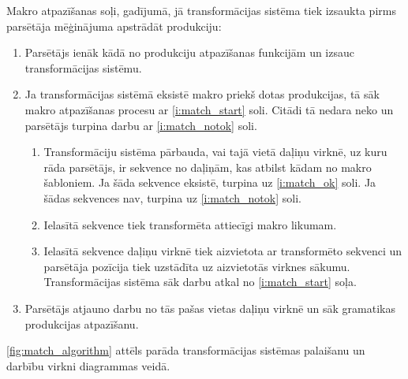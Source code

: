 Makro atpazīšanas soļi, gadījumā, jā transformācijas sistēma tiek izsaukta pirms parsētāja mēģinājuma apstrādāt produkciju:
\begin{enumerate}
\item
Parsētājs ienāk kādā no produkciju atpazīšanas funkcijām un izsauc transformācijas sistēmu.
\item
Ja transformācijas sistēmā eksistē makro priekš dotas produkcijas, tā sāk makro atpazīšanas procesu ar \ref{i:match_start} soli. Citādi tā nedara neko un parsētājs turpina darbu ar \ref{i:match_notok} soli.
\begin{enumerate}
\item \label{i:match_start}
Transformāciju sistēma pārbauda, vai tajā vietā daļiņu virknē, uz kuru rāda parsētājs, ir sekvence no daļiņām, kas atbilst kādam no makro šabloniem. Ja šāda sekvence eksistē, turpina uz \ref{i:match_ok} soli. Ja šādas sekvences nav, turpina uz \ref{i:match_notok} soli.
\item \label{i:match_ok}
Ielasītā sekvence tiek transformēta attiecīgi makro likumam.
\item
Ielasītā sekvence daļiņu virknē tiek aizvietota ar transformēto sekvenci un parsētāja pozīcija tiek uzstādīta uz aizvietotās virknes sākumu. Transformācijas sistēma sāk darbu atkal no \ref{i:match_start} soļa.
\end{enumerate}
\item \label{i:match_notok}
Parsētājs atjauno darbu no tās pašas vietas daļiņu virknē un sāk gramatikas produkcijas atpazīšanu. %
\end{enumerate}

\ref{fig:match_algorithm} attēls parāda transformācijas sistēmas palaišanu un darbību virkni diagrammas veidā.

